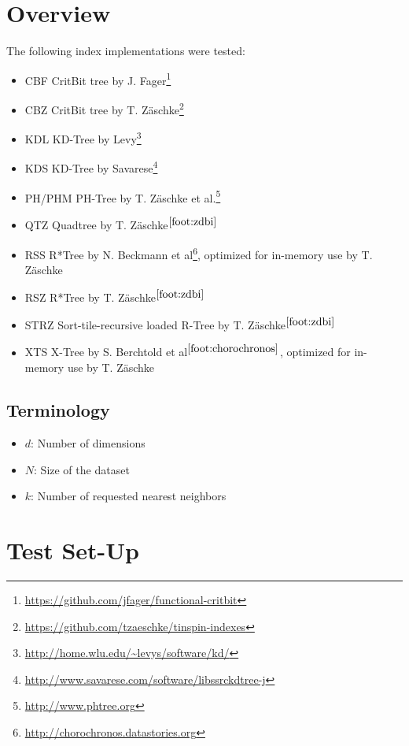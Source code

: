 \documentclass{vldb}
\begin{document}
\section{Overview}

The following index implementations were tested:

\begin{itemize}
	\item CBF CritBit tree by J. Fager\footnote{\url{https://github.com/jfager/functional-critbit}}
	\item CBZ CritBit tree by T. Z\"{a}schke\footnote{\url{https://github.com/tzaeschke/tinspin-indexes}\label{foot:zdbi}}
	\item KDL KD-Tree by Levy\footnote{\url{http://home.wlu.edu/~levys/software/kd/}}
	\item KDS KD-Tree by Savarese\footnote{\url{http://www.savarese.com/software/libssrckdtree-j}}
	\item PH/PHM PH-Tree by T. Z\"{a}schke et al.\footnote{\url{http://www.phtree.org}}
	\item QTZ Quadtree by T. Z\"{a}schke$^{\ref{foot:zdbi}}$
	\item RSS R*Tree by N. Beckmann et al\footnote{\url{http://chorochronos.datastories.org}\label{foot:chorochronos}}, optimized for in-memory use by T. Z\"{a}schke
	\item RSZ R*Tree by T. Z\"{a}schke$^{\ref{foot:zdbi}}$
	\item STRZ Sort-tile-recursive loaded R-Tree by T. Z\"{a}schke$^{\ref{foot:zdbi}}$
	\item XTS X-Tree by S. Berchtold et al$^{\ref{foot:chorochronos}}$, optimized for in-memory use by T. Z\"{a}schke
\end{itemize}

\subsection{Terminology}

\begin{itemize}
	\item $d$: Number of dimensions
	\item $N$: Size of the dataset
	\item $k$: Number of requested nearest neighbors
\end{itemize}



\newpage



\section{Test Set-Up}
\end{document}

